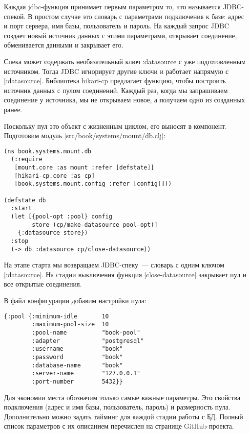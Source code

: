 Каждая jdbc-функция принимает первым параметром то, что называется
JDBC-спекой. В простом случае это словарь с параметрами подключения к базе:
адрес и порт сервера, имя базы, пользователь и пароль. На каждый запрос JDBC
создает новый источник данных с этими параметрами, открывает соединение,
обменивается данными и закрывает его.

Спека может содержать необязательный ключ :datasource с уже подготовленным
источником. Тогда JDBC игнорирует другие ключи и работает напрямую с
\spverb|:datasource|. Библиотека hikari-cp предлагает функцию, чтобы построить источник
данных с пулом соединений. Каждый раз, когда мы запрашиваем соединение у
источника, мы не открываем новое, а получаем одно из созданных ранее.

Поскольку пул это объект с жизненным циклом, его выносят в компонент. Подготовим
модуль \spverb|src/book/systems/mount/db.clj|:

\begin{verbatim}
(ns book.systems.mount.db
  (:require
   [mount.core :as mount :refer [defstate]]
   [hikari-cp.core :as cp]
   [book.systems.mount.config :refer [config]]))

(defstate db
  :start
  (let [{pool-opt :pool} config
        store (cp/make-datasource pool-opt)]
    {:datasource store})
  :stop
  (-> db :datasource cp/close-datasource))
\end{verbatim}

На этапе старта мы возвращаем JDBC-спеку~--- словарь с одним ключом
\spverb|:datasource|. На стадии выключения функция \spverb|close-datasource| закрывает пул и
все открытые соединения.

В файл конфигурации добавим настройки пула:

\begin{verbatim}
{:pool {:minimum-idle       10
        :maximum-pool-size  10
        :pool-name          "book-pool"
        :adapter            "postgresql"
        :username           "book"
        :password           "book"
        :database-name      "book"
        :server-name        "127.0.0.1"
        :port-number        5432}}
\end{verbatim}

Для экономии места обозначим только самые важные параметры. Это свойства
подключения (адрес и имя базы, пользователь, пароль) и размерность
пула. Дополнительно можно задать тайминг для каждой стадии работы с БД. Полный
список параметров с их описанием перечислен на странице GitHub-проекта.

